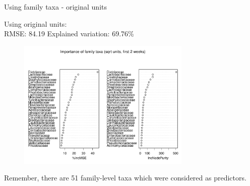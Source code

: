 \documentclass{beamer}
\begin{document}
\begin{frame}{Using family taxa - original units}

  {\scriptsize
    
  \noindent Using original units:\\
  RMSE: 84.19  \hspace{0.05in}  Explained variation: 69.76\%

  \begin{center}
    \begin{figure}
      \includegraphics[width=3.25in]{../only_families/first_two_weeks/sqrt_units_first_two_weeks_families_imp_plot}
    \end{figure}
  \end{center}
  \vspace{-0.25in}

\noindent Remember, there are 51 family-level taxa which were
considered as predictors.
}

\end{frame}
\end{document}
